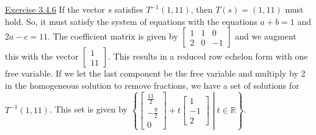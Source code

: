 \documentclass{exam}
\begin{document}
\underline{Exercise 3.4.6}
\newline
\newline
If the vector $s$ satisfies $T^{-1}(1,11)$, then $T(s)=(1,11)$ must hold. So, it must satisfy the system of equations with the equations $a+b=1$ and $2a-c=11$. The coefficient matrix is given by $
\begin{bmatrix}
    1 & 1 & 0 \\
    2 & 0 & -1
\end{bmatrix}$ and we augment this with the vector $
\begin{bmatrix}
    1 \\
    11
\end{bmatrix}$. This results in a reduced row echelon form with one free variable. If we let the last component be the free variable and multiply by 2 in the homogeneous solution to remove fractions, we have a set of solutions for $T^{-1}(1,11)$. This set is given by $\left\{
\begin{bmatrix}
    \frac{11}{2} \\
    -\frac{9}{2} \\
    0
\end{bmatrix} + t
\begin{bmatrix}
    1 \\
    -1 \\
    2
\end{bmatrix}\middle|t\in\mathbb{R}
\right\}$.
\end{document}
